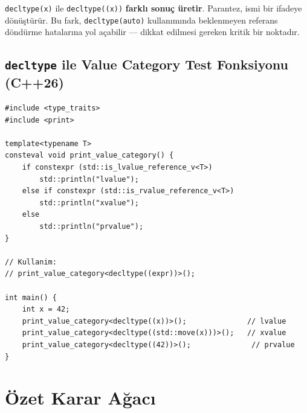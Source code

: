 \documentclass[a4paper,12pt]{article}
\begin{document}
\begin{notebox}
\texttt{decltype(x)} ile \texttt{decltype((x))} \textbf{farklı sonuç üretir}. Parantez, ismi bir ifadeye dönüştürür. Bu fark, \texttt{decltype(auto)} kullanımında beklenmeyen referans döndürme hatalarına yol açabilir --- dikkat edilmesi gereken kritik bir noktadır.
\end{notebox}

\subsection{\texttt{decltype} ile Value Category Test Fonksiyonu (C++26)}

\begin{lstlisting}
#include <type_traits>
#include <print>

template<typename T>
consteval void print_value_category() {
    if constexpr (std::is_lvalue_reference_v<T>)
        std::println("lvalue");
    else if constexpr (std::is_rvalue_reference_v<T>)
        std::println("xvalue");
    else
        std::println("prvalue");
}

// Kullanim:
// print_value_category<decltype((expr))>();

int main() {
    int x = 42;
    print_value_category<decltype((x))>();              // lvalue
    print_value_category<decltype((std::move(x)))>();   // xvalue
    print_value_category<decltype((42))>();              // prvalue
}
\end{lstlisting}

\section{Özet Karar Ağacı}

\begin{center}
\end{center}
\end{document}
